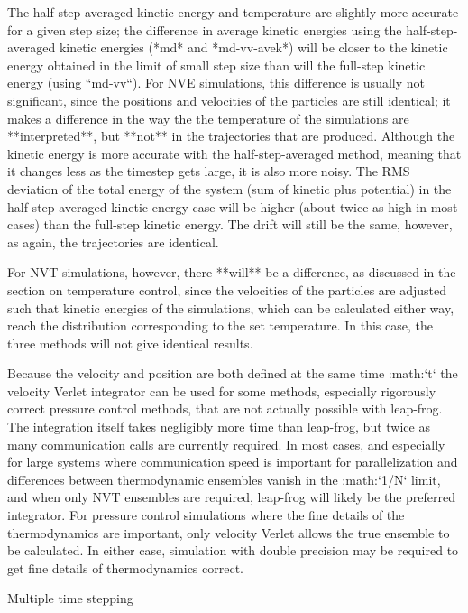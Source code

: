 The half-step-averaged kinetic energy and temperature are slightly more
accurate for a given step size; the difference in average kinetic
energies using the half-step-averaged kinetic energies (*md* and
*md-vv-avek*) will be closer to the kinetic energy obtained in the limit
of small step size than will the full-step kinetic energy (using
``md-vv``). For NVE simulations, this difference is usually not
significant, since the positions and velocities of the particles are
still identical; it makes a difference in the way the the temperature of
the simulations are **interpreted**, but **not** in the trajectories that
are produced. Although the kinetic energy is more accurate with the
half-step-averaged method, meaning that it changes less as the timestep
gets large, it is also more noisy. The RMS deviation of the total energy
of the system (sum of kinetic plus potential) in the half-step-averaged
kinetic energy case will be higher (about twice as high in most cases)
than the full-step kinetic energy. The drift will still be the same,
however, as again, the trajectories are identical.

For NVT simulations, however, there **will** be a difference, as discussed
in the section on temperature control, since the velocities of the
particles are adjusted such that kinetic energies of the simulations,
which can be calculated either way, reach the distribution corresponding
to the set temperature. In this case, the three methods will not give
identical results.

Because the velocity and position are both defined at the same time
:math:`t` the velocity Verlet integrator can be used for some methods,
especially rigorously correct pressure control methods, that are not
actually possible with leap-frog. The integration itself takes
negligibly more time than leap-frog, but twice as many communication
calls are currently required. In most cases, and especially for large
systems where communication speed is important for parallelization and
differences between thermodynamic ensembles vanish in the :math:`1/N`
limit, and when only NVT ensembles are required, leap-frog will likely
be the preferred integrator. For pressure control simulations where the
fine details of the thermodynamics are important, only velocity Verlet
allows the true ensemble to be calculated. In either case, simulation
with double precision may be required to get fine details of
thermodynamics correct.

Multiple time stepping
~~~~~~~~~~~~~~~~~~~~~~

